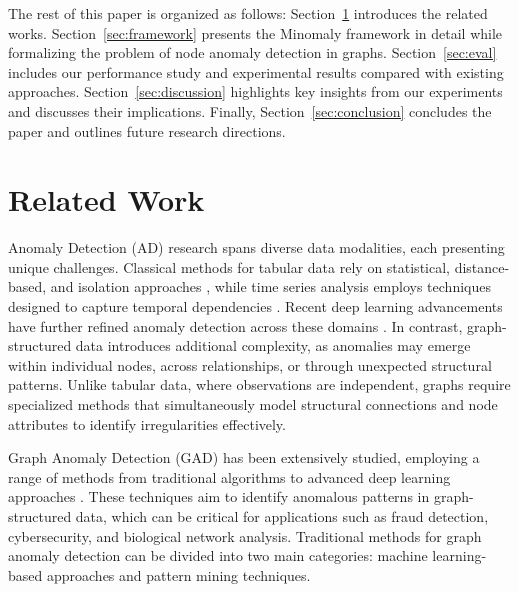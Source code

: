 \documentclass[pdflatex,sn-mathphys-num]{sn-jnl}%
\theoremstyle{thmstyleone}%
\theoremstyle{thmstyletwo}%
\theoremstyle{thmstylethree}%
\begin{document}
The rest of this paper is organized as follows:
{Section~\ref{sec:relatedworks}} introduces the related works.
{Section~\ref{sec:framework}} presents the Minomaly framework in detail while formalizing the problem of node anomaly detection in graphs.
{Section~\ref{sec:eval}} includes our performance study and experimental results compared with existing approaches. {Section~\ref{sec:discussion}} highlights key insights from our experiments and discusses their implications. Finally, {Section~\ref{sec:conclusion}} concludes the paper and outlines future research directions.

\section{Related Work}
\label{sec:relatedworks}

Anomaly Detection (AD) research spans diverse data modalities, each presenting unique challenges. Classical methods for tabular data rely on statistical, distance-based, and isolation approaches \cite{Ruff_2021,nassif2021machine,han2022adbench,agrawal2015survey}, while time series analysis employs techniques designed to capture temporal dependencies \cite{blazquez2021review,schmidl2022anomaly,benkabou2021local,benkabou2018unsupervised}. Recent deep learning advancements have further refined anomaly detection across these domains \cite{chalapathy2019deep,choi2021deep,Ma_2023}. In contrast, graph-structured data introduces additional complexity, as anomalies may emerge within individual nodes, across relationships, or through unexpected structural patterns. Unlike tabular data, where observations are independent, graphs require specialized methods that simultaneously model structural connections and node attributes to identify irregularities effectively.

Graph Anomaly Detection (GAD) has been extensively studied, employing a range of methods from traditional algorithms to advanced deep learning approaches \cite{Ma_2023}. These techniques aim to identify anomalous patterns in graph-structured data, which can be critical for applications such as fraud detection, cybersecurity, and biological network analysis. Traditional methods for graph anomaly detection can be divided into two main categories: machine learning-based approaches and pattern mining techniques.
\end{document}
